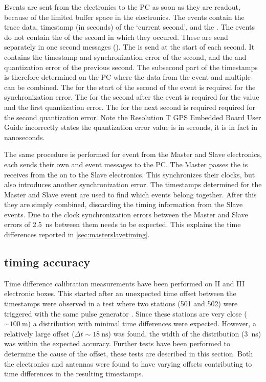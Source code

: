 Events are sent from the \hisparc electronics to the PC as soon as they are readout, because of the limited buffer space in the electronics. The events contain the trace data, timestamp (in seconds) of the `current second', and the \ctd. The events do not contain the \ctp of the second in which they occured. These are send separately in one second messages (\osm). The \osm is send at the start of each second. It contains the timestamp and synchronization error of the second, and the \ctp and quantization error of the previous second. The subsecond part of the timestamps is therefore determined on the PC where the data from the event and multiple \osm can be combined. The \osm for the start of the second of the event is required for the synchronization error. The \osm for the second after the event is required for the \ctp value and the first quantization error. The \osm for the next second is required required for the second quantization error. Note the Resolution T GPS Embedded Board User Guide incorrectly states the quantization error value is in seconds, it is in fact in nanoseconds.

The same procedure is performed for event from the Master and Slave electronics, each sends their own \osm and event messages to the PC. The Master passes the \pps is receives from the \gps on to the Slave electronics. This synchronizes their clocks, but also introduces another synchronization error. The timestamps determined for the Master and Slave event are used to find which events belong together. After this they are simply combined, discarding the timing information from the Slave events. Due to the clock synchronization errors between the Master and Slave errors of \SI{2.5}{\ns} between them needs to be expected. This explains the time differences reported in \cref{sec:masterslavetiming}.


\subsection{\gps timing accuracy}
\label{sec:gps_accuracy}

Time difference calibration measurements have been performed on \hisparc II and III electronic boxes. This started after an unexpected time offset between the timestamps were observed in a test where two \hisparc stations (501 and 502) were triggered with the same pulse generator \cite[p. 47]{fokkema2012hisparc}. Since these stations are very close ($\sim\SI{100}{\meter}$) a distribution with minimal time differences were expected. However, a relatively large offset ($\Delta t \sim\SI{18}{\ns}$) was found, the width of the distribution (\SI{3}{\ns}) was within the expected \gps accuracy. Further tests have been performed to determine the cause of the offset, these tests are described in this section. Both the \hisparc electronics and \gps antennas were found to have varying offsets contributing to time differences in the resulting timestamps.


